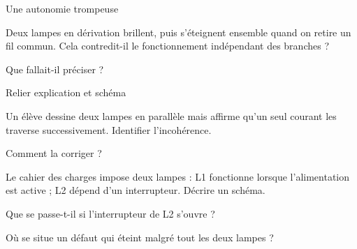 \par\noindent\begin{minipage}{\linewidth}
\begin{exercice}[3]{Une autonomie trompeuse}
\begin{questions}
\item Deux lampes en dérivation brillent, puis s’éteignent ensemble quand on retire un fil commun. Cela contredit-il le fonctionnement indépendant des branches ?
\item Que fallait-il préciser ?
\end{questions}
\end{exercice}
\end{minipage}
\par\noindent\begin{minipage}{\linewidth}
\begin{exercice}[3]{Relier explication et schéma}
\begin{questions}
\item Un élève dessine deux lampes en parallèle mais affirme qu’un seul courant les traverse successivement. Identifier l’incohérence.
\item Comment la corriger ?
\end{questions}
\end{exercice}
\end{minipage}
\label{defi-ex-13}
\begin{questions}
\item Le cahier des charges impose deux lampes : L1 fonctionne lorsque l’alimentation est active ; L2 dépend d’un interrupteur. Décrire un schéma.
\item Que se passe-t-il si l’interrupteur de L2 s’ouvre ?
\item Où se situe un défaut qui éteint malgré tout les deux lampes ?
\end{questions}
\pcGrille
